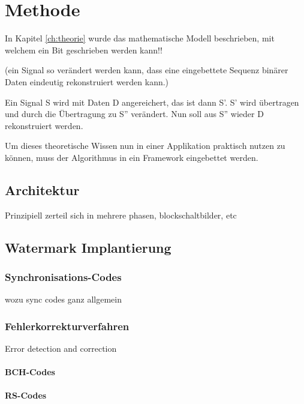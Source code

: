 \chapter{Methode}
\label{ch:methode}

In Kapitel \ref{ch:theorie} wurde das mathematische Modell beschrieben, mit welchem ein Bit geschrieben werden kann!!

(ein Signal so ver\"andert werden kann, dass eine eingebettete Sequenz bin\"arer Daten eindeutig rekonstruiert werden kann.)

Ein Signal S wird mit Daten D angereichert, das ist dann S'. S' wird übertragen und durch die Übertragung zu S'' verändert. Nun soll aus S'' wieder D rekonstruiert werden.

Um dieses theoretische Wissen nun in einer Applikation praktisch nutzen zu k\"onnen, muss der Algorithmus in ein Framework eingebettet werden. 

\section{Architektur}

Prinzipiell zerteil sich in mehrere phasen, blockschaltbilder, etc

\section{Watermark Implantierung}
\label{sec:embedding}

\subsection{Synchronisations-Codes}

wozu sync codes ganz allgemein

\subsection{Fehlerkorrekturverfahren}
\label{sec:errorcorrection}

Error detection and correction

\subsubsection{BCH-Codes}

\cite{chang2012location} \cite{huang2002blind}

\subsubsection{RS-Codes}

